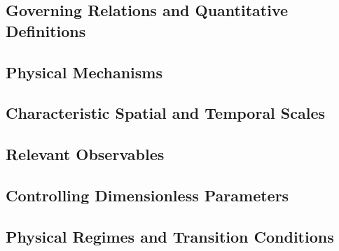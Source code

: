 \subsection{Governing Relations and Quantitative Definitions}
\label{sec:res-phy-pro-governing-relations}

%

\subsection{Physical Mechanisms}
\label{sec:res-phy-pro-physical-mechanisms}


\subsection{Characteristic Spatial and Temporal Scales}
\label{sec:res-phy-pro-characteristic-spatial-temporal-scales}


\subsection{Relevant Observables}
\label{sec:res-phy-pro-relevant-observables}


\subsection{Controlling Dimensionless Parameters}
\label{sec:res-phy-pro-controlling-dimensionless-parameters}


\subsection{Physical Regimes and Transition Conditions}
\label{sec:res-phy-pro-physical-regimes-transition-conditions}


